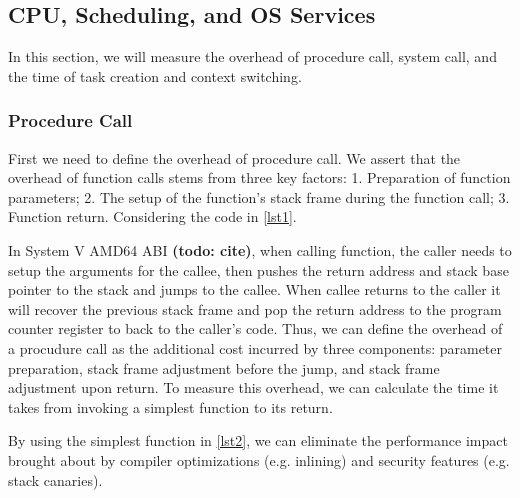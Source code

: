 \subsection{CPU, Scheduling, and OS Services}
In this section, we will measure the overhead of procedure call, system call, and the time of task creation and context switching.

\subsubsection{Procedure Call}
First we need to define the overhead of procedure call. We assert that the overhead of function calls stems from three key factors: 1. Preparation of function parameters; 2. The setup of the function's stack frame during the function call; 3. Function return. Considering the code in \ref{lst1}. 

In System V AMD64 ABI \textbf{(todo: cite)}, when calling function, the caller needs to setup the arguments for the callee, then pushes the return address and stack base pointer to the stack and jumps to the callee. When callee returns to the caller it will recover the previous stack frame and pop the return address to the program counter register to back to the caller's code. Thus, we can define the overhead of a procudure call as the additional cost incurred by three components: parameter preparation, stack frame adjustment before the jump, and stack frame adjustment upon return. To measure this overhead, we can calculate the time it takes from invoking a simplest function to its return.

By using the simplest function in \ref{lst2}, we can eliminate the performance impact brought about by compiler optimizations (e.g. inlining) and security features (e.g. stack canaries).

